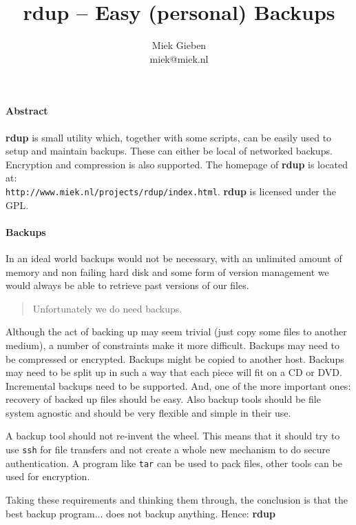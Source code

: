 \documentclass[a4, 10pt]{article}
\newcommand{\rdup}{\textbf{rdup}}
\newcommand{\cmd}[1]{\texttt{#1}}
\newcommand{\url}[1]{\texttt{#1}}
\begin{document}
\pagestyle{empty}

\title{\rdup{} -- Easy (personal) Backups}
\author{Miek Gieben\\miek@miek.nl}
\date{}
\maketitle
\thispagestyle{empty}

\paragraph{Abstract}
\rdup{} is small utility which, together with some scripts, can
be easily used to setup and maintain backups. These can either be local
of networked backups. Encryption and compression is also supported.
The homepage of \rdup{} is located at: \\
\url{http://www.miek.nl/projects/rdup/index.html}. \rdup{} is licensed
under the GPL.

\paragraph{Backups}
In an ideal world backups would not be necessary, with an unlimited
amount of memory and non failing hard disk and some form of version
management we would always be able to retrieve past versions of our files.
\begin{quote}
Unfortunately we do need backups.
\end{quote}
Although the act of backing up may seem trivial (just copy some files
to another medium), a number of constraints make it more difficult. 
Backups may need to be compressed or encrypted. Backups might be copied
to another host. Backups may need to be split up in such a way that
each piece will fit on a CD or DVD. Incremental backups need to be
supported. And, one of the more important ones: recovery of backed up
files should be easy.  Also backup tools should be file system agnostic
and should be very flexible and simple in their use.

A backup tool should not re-invent the wheel.  This means that it should
try to use \cmd{ssh} for file transfers and not create a whole new
mechanism to do secure authentication. A program like \cmd{tar} can be
used to pack files, other tools can be used for encryption. 

Taking these requirements and thinking them through, the
conclusion is that the best backup program... does not backup anything.
Hence: \rdup
\end{document}
